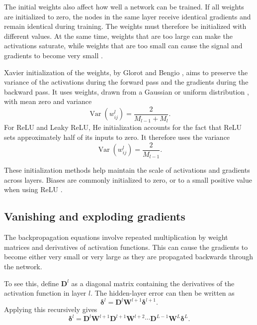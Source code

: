 \documentclass[amssymb,secnumarabic,twocolumn,aps]{revtex4}
\begin{document}
The initial weights also affect how well a network can be trained. If all weights are initialized to zero, the nodes in the same layer receive identical gradients and remain identical during training. The weights must therefore be initialized with different values. At the same time, weights that are too large can make the activations saturate, while weights that are too small can cause the signal and gradients to become very small \cite{lecturebook}.

Xavier initialization of the weights, by Glorot and Bengio \cite{Xavier2010}, aims to preserve the variance of the activations during the forward pass and the gradients during the backward pass. It uses weights, drawn from a Gaussian or uniform distribution \cite{lecturebook}, with mean zero and variance
\begin{equation*}
    \operatorname{Var}(w_{ij}^l)
    =\frac{2}{M_{l-1}+M_l}.
\end{equation*}
For ReLU and Leaky ReLU, He initialization \cite{He2015} accounts for the fact that ReLU sets approximately half of its inputs to zero. It therefore uses the variance
\begin{equation*}
    \operatorname{Var}(w_{ij}^l)
    =\frac{2}{M_{l-1}}.
\end{equation*}

These initialization methods help maintain the scale of activations and gradients across layers. Biases are commonly initialized to zero, or to a small positive value when using ReLU \cite{lecturebook}.

\subsection{Vanishing and exploding gradients}

The backpropagation equations involve repeated multiplication by weight matrices and derivatives of activation functions. This can cause the gradients to become either very small or very large as they are propagated backwards through the network.

To see this, define $\boldsymbol{D}^l$ as a diagonal matrix containing the derivatives of the activation function in layer $l$. The hidden-layer error can then be written as
\begin{equation*}
    \boldsymbol{\delta}^l
    =\boldsymbol{D}^l
    \boldsymbol{W}^{l+1}
    \boldsymbol{\delta}^{l+1}.
\end{equation*}
Applying this recursively gives
\begin{equation*}
    \boldsymbol{\delta}^l
    =
    \boldsymbol{D}^l\boldsymbol{W}^{l+1}
    \boldsymbol{D}^{l+1}\boldsymbol{W}^{l+2}
    \cdots
    \boldsymbol{D}^{L-1}\boldsymbol{W}^{L}
    \boldsymbol{\delta}^{L}.
\end{equation*}
\end{document}
